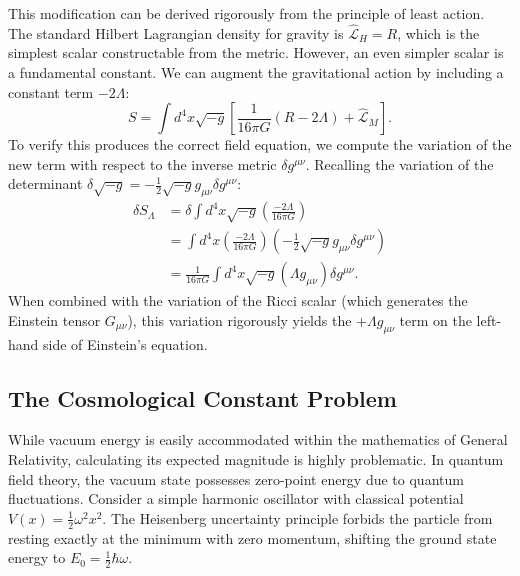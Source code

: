 \documentclass[11pt, a4paper]{report}
\begin{document}
This modification can be derived rigorously from the principle of least action. The standard Hilbert Lagrangian density for gravity is $\hat{\mathcal{L}}_H = R$, which is the simplest scalar constructable from the metric. However, an even simpler scalar is a fundamental constant. We can augment the gravitational action by including a constant term $-2\Lambda$:
\begin{equation}
\label{eq:action_lambda}
S = \int d^4x \sqrt{-g} \left[ \frac{1}{16\pi G} (R - 2\Lambda) + \hat{\mathcal{L}}_M \right].
\end{equation}
To verify this produces the correct field equation, we compute the variation of the new term with respect to the inverse metric $\delta g^{\mu\nu}$. Recalling the variation of the determinant $\delta\sqrt{-g} = -\frac{1}{2}\sqrt{-g}g_{\mu\nu}\delta g^{\mu\nu}$:
\begin{align}
\delta S_{\Lambda} &= \delta \int d^4x \sqrt{-g} \left( \frac{-2\Lambda}{16\pi G} \right) \nonumber \\
&= \int d^4x \left( \frac{-2\Lambda}{16\pi G} \right) \left( -\frac{1}{2}\sqrt{-g}g_{\mu\nu}\delta g^{\mu\nu} \right) \nonumber \\
&= \frac{1}{16\pi G} \int d^4x \sqrt{-g} \left( \Lambda g_{\mu\nu} \right) \delta g^{\mu\nu}.
\end{align}
When combined with the variation of the Ricci scalar (which generates the Einstein tensor $G_{\mu\nu}$), this variation rigorously yields the $+\Lambda g_{\mu\nu}$ term on the left-hand side of Einstein's equation.

\subsection{The Cosmological Constant Problem}

While vacuum energy is easily accommodated within the mathematics of General Relativity, calculating its expected magnitude is highly problematic. In quantum field theory, the vacuum state possesses zero-point energy due to quantum fluctuations. Consider a simple harmonic oscillator with classical potential $V(x) = \frac{1}{2}\omega^2 x^2$. The Heisenberg uncertainty principle forbids the particle from resting exactly at the minimum with zero momentum, shifting the ground state energy to $E_0 = \frac{1}{2}\hbar\omega$.
\end{document}

